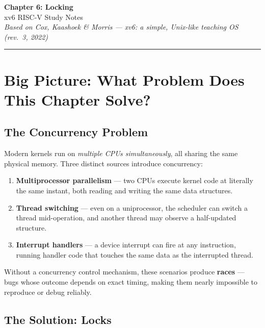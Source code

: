 \documentclass[11pt, a4paper]{article}
\begin{document}
\begin{center}
  {\LARGE\bfseries\sffamily Chapter 6: Locking}\\[0.4em]
  {\large\sffamily xv6 RISC-V Study Notes}\\[0.2em]
  {\small\itshape Based on Cox, Kaashoek \& Morris --- \emph{xv6: a simple, Unix-like teaching OS} (rev.\ 3, 2022)}
\end{center}

\vspace{0.5em}\hrule\vspace{1em}

\section{Big Picture: What Problem Does This Chapter Solve?}

\subsection{The Concurrency Problem}

Modern kernels run on \emph{multiple CPUs simultaneously}, all sharing the same physical memory. Three distinct sources introduce concurrency:

\begin{enumerate}[leftmargin=2em]
  \item \textbf{Multiprocessor parallelism} --- two CPUs execute kernel code at literally the same instant, both reading and writing the same data structures.
  \item \textbf{Thread switching} --- even on a uniprocessor, the scheduler can switch a thread mid-operation, and another thread may observe a half-updated structure.
  \item \textbf{Interrupt handlers} --- a device interrupt can fire at any instruction, running handler code that touches the same data as the interrupted thread.
\end{enumerate}

Without a concurrency control mechanism, these scenarios produce \textbf{races} --- bugs whose outcome depends on exact timing, making them nearly impossible to reproduce or debug reliably.

\subsection{The Solution: Locks}
\end{document}
